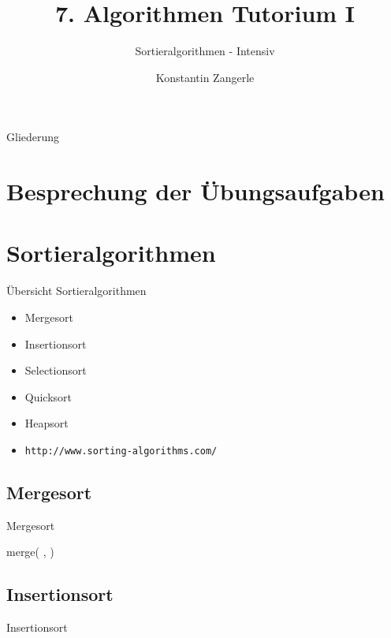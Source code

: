 \documentclass[18pt]{beamer}
\title[Algo I Tut]{7. Algorithmen Tutorium I}
\subtitle{Sortieralgorithmen - Intensiv} %
\author[Zangerle]{Konstantin Zangerle}
\institute{Institut für Theoretische Informatik}
\begin{document}

\begin{frame}
\titlepage
\end{frame}

\begin{frame}{Gliederung}
 \tableofcontents
\end{frame}


\section{Besprechung der Übungsaufgaben}

\section{Sortieralgorithmen}
\begin{frame}[fragile]{Übersicht Sortieralgorithmen}
 \begin{itemize}
  \item Mergesort
  \item Insertionsort
  \item Selectionsort
  \item Quicksort
  \item Heapsort
  \item \verb|http://www.sorting-algorithms.com/|
 \end{itemize}

\end{frame}

\subsection{Mergesort}
\begin{frame}[fragile]{Mergesort}
\begin{algorithmic}
     
    \Else
      \State \Return merge(
      ,
      )
   \EndIf
  
   
 \EndFunction
\end{algorithmic}

\end{frame}

\subsection{Insertionsort}
\begin{frame}{Insertionsort}
\end{frame}
\end{document}
